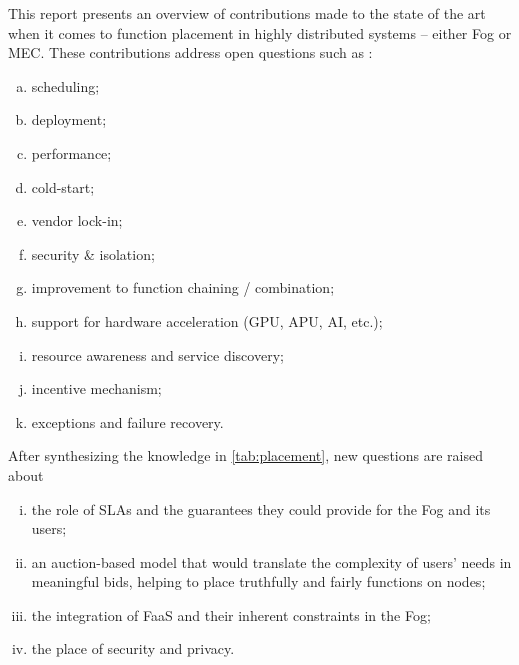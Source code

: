 This report presents an overview of contributions made to the state of the art when it comes to function placement in highly distributed systems -- either Fog or \gls{MEC}. These contributions address open questions such as \cite{kjorveziroski_iot_2021,xie_when_2021}:
\begin{enumerate}[(a)]
	\item scheduling;
	\item deployment;
	\item performance;
	\item cold-start;
	\item vendor lock-in;
	\item security \& isolation;
	\item improvement to function chaining / combination;
	\item support for hardware acceleration (\gls{GPU}, \gls{APU}, \gls{AI}, etc.);
	\item resource awareness and service discovery;
	\item incentive mechanism;
	\item exceptions and failure recovery.
\end{enumerate}
After synthesizing the knowledge in \cref{tab:placement}, new questions are raised about
\begin{enumerate}[(i)]
	\item the role of \glspl{SLA} and the guarantees they could provide for the Fog and its users;
	\item an auction-based model that would translate the complexity of users' needs in meaningful bids, helping to place truthfully and fairly functions on nodes;
	\item the integration of \gls{FaaS} and their inherent constraints in the Fog;
	\item the place of security and privacy.
\end{enumerate}
